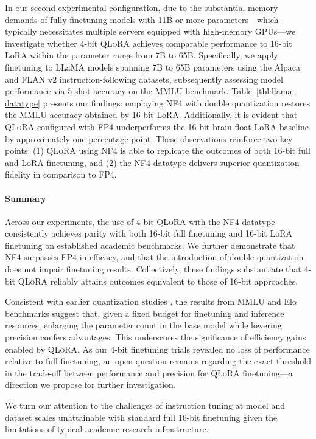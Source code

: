 In our second experimental configuration, due to the substantial memory demands of fully finetuning models with 11B or more parameters—which typically necessitates multiple servers equipped with high-memory GPUs—we investigate whether 4-bit \textsc{QLoRA} achieves comparable performance to 16-bit LoRA within the parameter range from 7B to 65B. Specifically, we apply finetuning to LLaMA models spanning 7B to 65B parameters using the Alpaca and FLAN v2 instruction-following datasets, subsequently assessing model performance via 5-shot accuracy on the MMLU benchmark. Table~\ref{tbl:llama-datatype} presents our findings: employing NF4 with double quantization restores the MMLU accuracy obtained by 16-bit LoRA. Additionally, it is evident that \textsc{QLoRA} configured with FP4 underperforms the 16-bit brain float LoRA baseline by approximately one percentage point. These observations reinforce two key points: (1) \textsc{QLoRA} using NF4 is able to replicate the outcomes of both 16-bit full and LoRA finetuning, and (2) the NF4 datatype delivers superior quantization fidelity in comparison to FP4.

\paragraph{Summary} Across our experiments, the use of 4-bit \textsc{QLoRA} with the NF4 datatype consistently achieves parity with both 16-bit full finetuning and 16-bit LoRA finetuning on established academic benchmarks. We further demonstrate that NF4 surpasses FP4 in efficacy, and that the introduction of double quantization does not impair finetuning results. Collectively, these findings substantiate that 4-bit \textsc{QLoRA} reliably attains outcomes equivalent to those of 16-bit approaches.

Consistent with earlier quantization studies \citep{dettmers2022case}, the results from MMLU and Elo benchmarks suggest that, given a fixed budget for finetuning and inference resources, enlarging the parameter count in the base model while lowering precision confers advantages. This underscores the significance of efficiency gains enabled by \textsc{QLoRA}. As our 4-bit finetuning trials revealed no loss of performance relative to full-finetuning, an open question remains regarding the exact threshold in the trade-off between performance and precision for QLoRA finetuning—a direction we propose for further investigation.

We turn our attention to the challenges of instruction tuning at model and dataset scales unattainable with standard full 16-bit finetuning given the limitations of typical academic research infrastructure.

